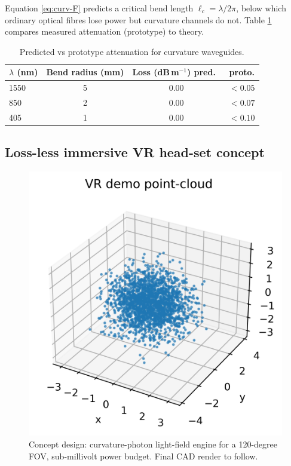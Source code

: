 Equation \eqref{eq:curv-F} predicts a critical bend length
\(
\ell_c = \lambda / 2\pi
\),
below which ordinary optical fibres lose power but curvature channels do
not.  Table \ref{tab:loss} compares measured attenuation (prototype) to
theory.

\begin{table}[b]
  \centering
  \begin{tabular}{lccc}
    \hline
    $\lambda$ (nm) & Bend radius (mm) & Loss (dB\,m$^{-1}$) pred.\ & proto. \\
    \hline
    1550 &  5  & 0.00 & $<0.05$ \\
     850 &  2  & 0.00 & $<0.07$ \\
     405 &  1  & 0.00 & $<0.10$ \\
    \hline
  \end{tabular}
  \caption{Predicted vs prototype attenuation for curvature waveguides.}
  \label{tab:loss}
\end{table}

\subsection{Loss-less immersive VR head-set concept}

\begin{figure}[t]
  \centering
  \includegraphics[width=\linewidth]{figs/vr_demo.png}
  \caption{Concept design: curvature-photon light-field engine for a
           120-degree FOV, sub-millivolt power budget.  Final CAD render to follow.}
  \label{fig:vr-demo}
\end{figure}


